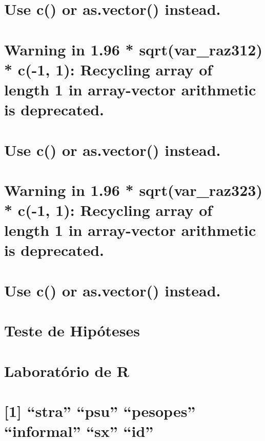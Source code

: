 \documentclass[]{book}
\theoremstyle{definition}
\theoremstyle{definition}
\theoremstyle{definition}
\theoremstyle{remark}
\begin{document}
\section{Use c() or as.vector()
instead.}\label{use-c-or-as.vector-instead.-3}

\section{Warning in 1.96 * sqrt(var\_raz312) * c(-1, 1): Recycling array
of length 1 in array-vector arithmetic is
deprecated.}\label{warning-in-1.96-sqrtvar_raz312-c-1-1-recycling-array-of-length-1-in-array-vector-arithmetic-is-deprecated.}

\section{Use c() or as.vector()
instead.}\label{use-c-or-as.vector-instead.-4}

\section{Warning in 1.96 * sqrt(var\_raz323) * c(-1, 1): Recycling array
of length 1 in array-vector arithmetic is
deprecated.}\label{warning-in-1.96-sqrtvar_raz323-c-1-1-recycling-array-of-length-1-in-array-vector-arithmetic-is-deprecated.}

\section{Use c() or as.vector()
instead.}\label{use-c-or-as.vector-instead.-5}

\section{Teste de Hipóteses}\label{teste-de-hipoteses}

\section{Laboratório de R}\label{laboratorio-de-r-3}

\section{\texorpdfstring{{[}1{]} ``stra'' ``psu'' ``pesopes''
``informal'' ``sx''
``id''}{{[}1{]} stra psu pesopes informal sx id}}\label{stra-psu-pesopes-informal-sx-id}
\end{document}
